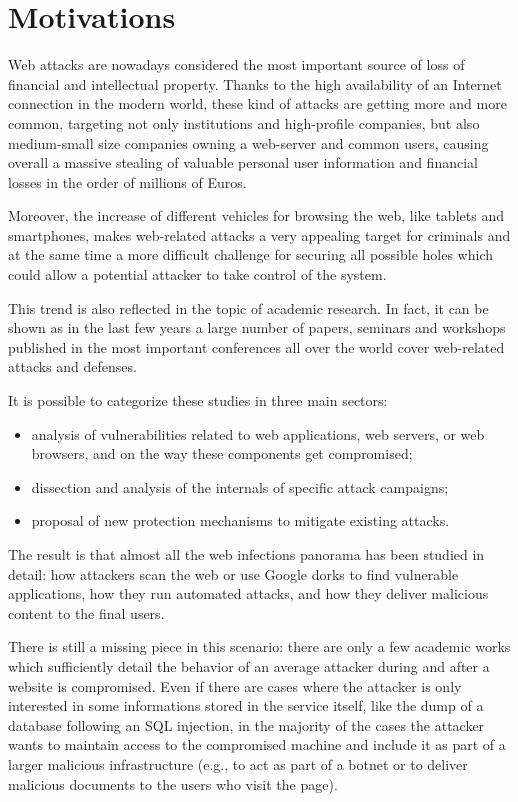 \section{Motivations}

Web attacks are nowadays considered the most important source of loss of financial and intellectual property.
Thanks to the high availability of an Internet connection in the modern world, these kind of attacks are getting more and more common, targeting not only institutions and high-profile companies, but also medium-small size companies owning a web-server and common users, causing overall a massive stealing of valuable personal user information and financial losses in the order of millions of Euros.

Moreover, the increase of different vehicles for browsing the web, like tablets and smartphones, makes web-related attacks a very appealing target for criminals and at the same time a more difficult challenge for securing all possible holes which could allow a potential attacker to take control of the system.

This trend is also reflected in the topic of academic research. In fact, it can be shown as in the last few years a large number of papers, seminars and workshops published in the most important conferences all over the world cover web-related attacks and defenses.

It is possible to categorize these studies in three main sectors:
\begin{itemize}
\item analysis of vulnerabilities related to web applications, web servers, or web browsers, and on the way these components get compromised;
\item dissection and analysis of the internals of specific attack campaigns;
\item proposal of new protection mechanisms to mitigate existing attacks.
\end{itemize}
The result is that almost all the web infections panorama has been studied in detail: how attackers scan the web or use Google dorks to find vulnerable applications, how they run automated attacks, and how they deliver malicious content to the final users.

There is still a missing piece in this scenario: there are only a few academic works which sufficiently detail the behavior of an average attacker during and after a website is compromised.
Even if there are cases where the attacker is only interested in some informations stored in the service itself, like the dump of a database following an SQL injection, in the majority of the cases the attacker wants to maintain access to the compromised machine and include it as part of a larger malicious infrastructure (e.g., to act as part of a botnet or to deliver malicious documents to the users who visit the page).

